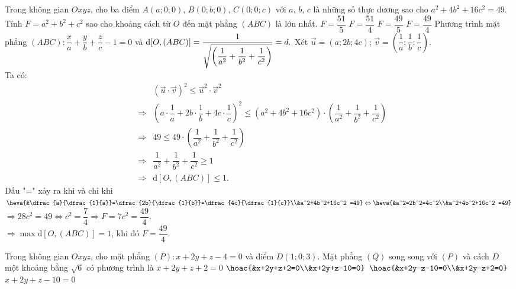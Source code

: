 \begin{ex}%
	Trong không gian $Oxyz$, cho ba điểm $A(a;0;0)$, $B(0;b;0)$, $C(0;0;c)$ với $a$, $b$, $c$ là những số thực dương sao cho $a^2+4b^2+16c^2=49$. Tính $F=a^2+b^2+c^2$ sao cho khoảng cách từ $O$ đến mặt phẳng $(ABC)$ là lớn nhất.
	\choice
	{$F=\dfrac{51}{5}$}
	{$F=\dfrac{51}{4}$}
	{$F=\dfrac{49}{5}$}
	{\True $F=\dfrac{49}{4}$}
	\loigiai
	{
		Phương trình mặt phẳng $(ABC): \dfrac{x}{a}+\dfrac{y}{b}+\dfrac{z}{c}-1=0$ và $\mathrm{d}[O,(ABC)]=\dfrac{1}{\sqrt{\left(\dfrac{1}{a^2}+\dfrac{1}{b^2}+\dfrac{1}{c^2}\right)}}=d.\\$	 
		Xét $\overrightarrow{u}=(a;2b;4c)$; $\overrightarrow{v}=\left(\dfrac{1}{a};\dfrac{1}{b};\dfrac{1}{c}\right)$.\\
		Ta có:
		\begin{eqnarray*}
			& & \left(\overrightarrow{u} \cdot \overrightarrow{v}\right)^2 \le \overrightarrow{u}^2 \cdot \overrightarrow{v}^2\\
			& \Rightarrow & \left(a \cdot \dfrac{1}{a} + 2b \cdot \dfrac{1}{b} +4c \cdot \dfrac{1}{c} \right)^2 \le \left(a^2+4b^2+16c^2\right) \cdot \left(\dfrac{1}{a^2}+\dfrac{1}{b^2}+\dfrac{1}{c^2}\right)\\
			& \Rightarrow & 49 \le 49 \cdot \left(\dfrac{1}{a^2}+\dfrac{1}{b^2}+\dfrac{1}{c^2}\right)\\
			& \Rightarrow &  \dfrac{1}{a^2}+\dfrac{1}{b^2}+\dfrac{1}{c^2} \ge 1 \\
			& \Rightarrow & \mathrm{d}[O,(ABC)] \le 1.
		\end{eqnarray*}
		Dấu "=" xảy ra khi và chỉ khi $\heva{&\dfrac{a}{\dfrac{1}{a}}=\dfrac{2b}{\dfrac{1}{b}}=\dfrac{4c}{\dfrac{1}{c}}\\&a^2+4b^2+16c^2 =49} \Leftrightarrow \heva{&a^2=2b^2=4c^2\\&a^2+4b^2+16c^2 =49}$\\
		$\Rightarrow 28c^2=49 \Leftrightarrow c^2 = \dfrac{7}{4} \Rightarrow F= 7c^2 = \dfrac{49}{4}$.\\
		$\Rightarrow \max\limits \mathrm{d}[O,(ABC)] =1$, khi đó $F=\dfrac{49}{4}$.
	}
\end{ex}
\begin{ex}%
	Trong không gian $Oxyz$, cho mặt phẳng $ (P)\colon x+2y+z-4=0 $ và điểm $ D(1;0;3) $. Mặt phẳng $ (Q) $ song song với $ (P) $ và cách $ D $ một khoảng bằng $ \sqrt{6} $ có phương trình là
	\choice
	{$ x+2y+z+2=0 $}
	{\True $ \hoac{&x+2y+z+2=0\\&x+2y+z-10=0} $}
	{$ \hoac{&x+2y-z-10=0\\&x+2y-z+2=0} $}
	{$ x+2y+z-10=0 $}
\end{ex}

